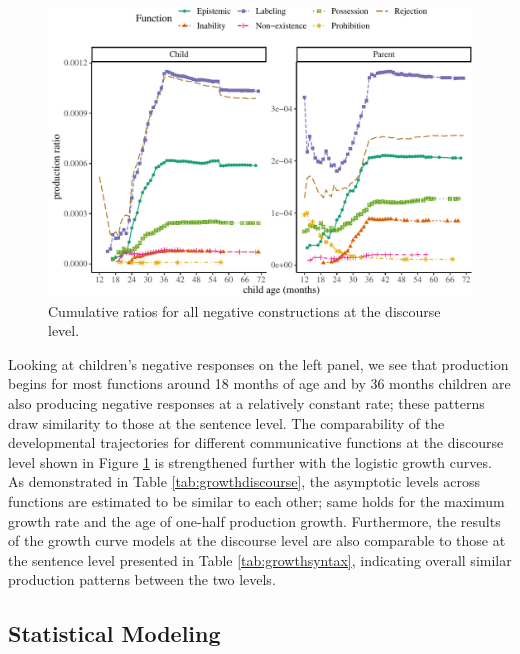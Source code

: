 \documentclass[
  man,floatsintext]{apa6}
\begin{document}
\begin{figure}[H]

{\centering \includegraphics{neg_construction_article_files/figure-latex/alldiscourse-1} 

}

\caption{Cumulative ratios for all negative constructions at the discourse level.}\label{fig:alldiscourse}
\end{figure}

Looking at children's negative responses on the left panel, we see that production begins for most functions around 18 months of age and by 36 months children are also producing negative responses at a relatively constant rate; these patterns draw similarity to those at the sentence level. The comparability of the developmental trajectories for different communicative functions at the discourse level shown in Figure \ref{fig:alldiscourse} is strengthened further with the logistic growth curves. As demonstrated in Table \ref{tab:growthdiscourse}, the asymptotic levels across functions are estimated to be similar to each other; same holds for the maximum growth rate and the age of one-half production growth. Furthermore, the results of the growth curve models at the discourse level are also comparable to those at the sentence level presented in Table \ref{tab:growthsyntax}, indicating overall similar production patterns between the two levels.

\hypertarget{statistical-modeling}{%
\subsection{Statistical Modeling}\label{statistical-modeling}}
\end{document}
